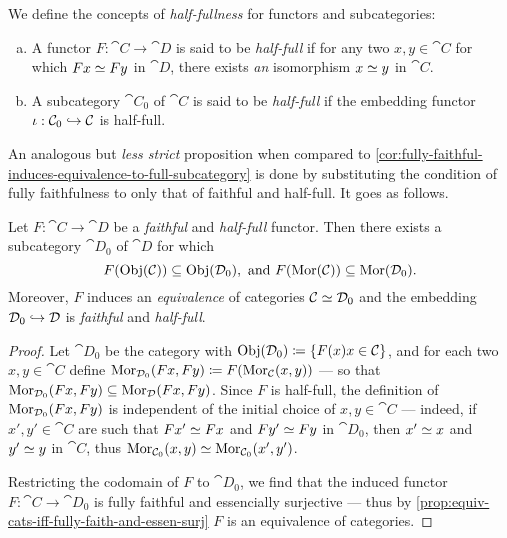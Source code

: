 \begin{definition}
\label{def:half-full}
We define the concepts of \emph{half-fullness} for functors and subcategories:
\begin{enumerate}[(a)]\setlength\itemsep{0em}
\item A functor \(F: \cat C \to \cat D\) is said to be \emph{half-full} if for
  any two \(x, y \in \cat C\) for which \(F x \simeq F y\) in \(\cat D\), there
  exists \emph{an} isomorphism \(x \simeq y\) in \(\cat C\).

\item A subcategory \(\cat C_0\) of \(\cat C\) is said to be \emph{half-full} if
  the embedding functor \(\iota: \mathcal C_0 \hookrightarrow \mathcal C\) is half-full.
\end{enumerate}
\end{definition}

An analogous but \emph{less strict} proposition when compared to
\cref{cor:fully-faithful-induces-equivalence-to-full-subcategory} is done by
substituting the condition of fully faithfulness to only that of faithful and
half-full. It goes as follows.

\begin{proposition}
\label{prop:faithful-half-full-induces-equivalence-to-subcategory}
Let \(F: \cat C \to \cat D\) be a \emph{faithful} and \emph{half-full}
functor. Then there exists a subcategory \(\cat D_0\) of \(\cat D\) for which
\[
F(\operatorname{Obj}(\mathcal C)) \subseteq \operatorname{Obj}(\mathcal D_0),
\text{ and }
F(\operatorname{Mor}(\mathcal C)) \subseteq \operatorname{Mor}(\mathcal D_0).
\]
Moreover, \(F\) induces an \emph{equivalence} of categories
\(\mathcal C \simeq \mathcal D_0\) and the embedding
\(\mathcal D_0 \hookrightarrow \mathcal D\) is \emph{faithful} and
\emph{half-full}.
\end{proposition}

\begin{proof}
Let \(\cat D_0\) be the category with
\(\operatorname{Obj}(\mathcal D_0) \coloneq \{F(x) \relax x \in \mathcal C\}\), and for each two
\(x, y \in \cat C\) define
\(\operatorname{Mor}_{\mathcal D_0}(F x, F y) \coloneq F(\operatorname{Mor}_{\mathcal C}(x, y))\) --- so that
\(\operatorname{Mor}_{\mathcal D_0}(F x, F y) \subseteq \operatorname{Mor}_{\mathcal D}(F x, F y)\). Since \(F\) is
half-full, the definition of \(\operatorname{Mor}_{\mathcal D_0}(F x, F y)\) is independent of the
initial choice of \(x, y \in \cat C\) --- indeed, if \(x', y' \in \cat C\) are
such that \(F x' \simeq F x\) and \(F y' \simeq F y\) in \(\cat D_0\), then \(x'
\simeq x\) and \(y' \simeq y\) in \(\cat C\), thus \(\operatorname{Mor}_{\mathcal C_0}(x, y) \simeq
\operatorname{Mor}_{\mathcal C_0}(x', y')\).

Restricting the codomain of \(F\) to \(\cat D_0\), we find that the induced
functor \(F: \cat C \to \cat D_0\) is fully faithful and essencially surjective
--- thus by \cref{prop:equiv-cats-iff-fully-faith-and-essen-surj} \(F\) is an
equivalence of categories.
\end{proof}

